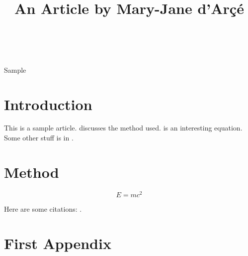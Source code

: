 \documentclass[wcp]{jmlr}
\title[D'Arçé Article]{An  Article by Mary-Jane d'Arçé}
\author{\Name{Mary-Jane {d'Arçé}}\Email{mjdb@sample.com}\\
\addr{University of No Where}}
\begin{document}
\maketitle

\begin{abstract}
\lipsum[1]
\end{abstract}
\begin{keywords}
Sample
\end{keywords}

\section{Introduction}

This is a sample article.  discusses
the method used.  is an interesting 
equation. Some other stuff is in .

\lipsum

\section{Method}\label{sec:method}

\lipsum

\begin{equation}\label{eq:emc2}
E = mc^2
\end{equation}

\lipsum

Here are some citations: \citet{article-full,incollection-minimal}.



\appendix
\section{First Appendix}\label{apd:first}

\lipsum
\end{document}
